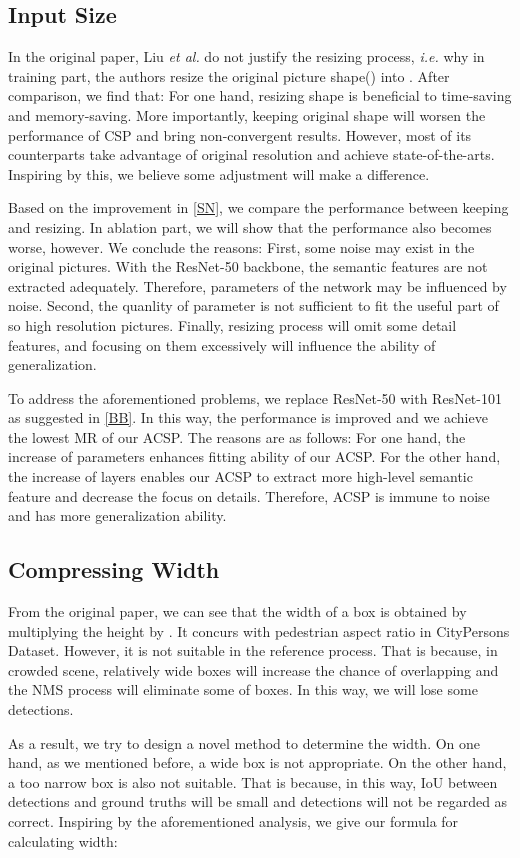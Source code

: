 \documentclass[twocolumn]{article}
\begin{document}
\subsection{Input Size}\label{is}
In the original paper\cite{liu2019high}, Liu \textit{et al.} do not justify the resizing process, \textit{i.e.} why in training part, the authors resize the original picture shape() into . After comparison, we find that: For one hand, resizing shape is beneficial to time-saving and memory-saving. More importantly, keeping original shape will worsen the performance of CSP\cite{liu2019high} and bring non-convergent results. However, most of its counterparts take advantage of original resolution and achieve state-of-the-arts. Inspiring by this, we believe some adjustment will make a difference.\par 
Based on the improvement in \ref{SN}, we compare the performance between keeping and resizing. In ablation part, we will show that the performance also becomes worse, however. We conclude the reasons: First, some noise may exist in the original pictures. With the ResNet-50 backbone, the semantic features are not extracted adequately. Therefore, parameters of the network may be influenced by noise. Second, the quanlity of parameter is not sufficient to fit the useful part of so high resolution pictures. Finally, resizing process will omit some detail features, and focusing on them excessively will influence the ability of generalization.\par 
To address the aforementioned problems, we replace ResNet-50 with ResNet-101 as suggested in \ref{BB}. In this way, the performance is improved and we achieve the lowest MR of our ACSP. The reasons are as follows: For one hand, the increase of parameters enhances fitting ability of our ACSP. For the other hand, the increase of layers enables our ACSP to extract more high-level semantic feature and decrease the focus on details. Therefore, ACSP is immune to noise and has more generalization ability.

\subsection{Compressing Width}
From the original paper\cite{liu2019high}, we can see that the width of a box is obtained by multiplying the height by . It concurs with pedestrian aspect ratio in CityPersons Dataset\cite{zhang2017citypersons}. However, it is not suitable in the reference process. That is because, in crowded scene, relatively wide boxes will increase the chance of overlapping and the NMS process will eliminate some of boxes. In this way, we will lose some detections.\par 
As a result, we try to design a novel method to determine the width. On one hand, as we mentioned before, a wide box is not appropriate. On the other hand, a too narrow box is also not suitable. That is because, in this way, IoU between detections and ground truths will be small and detections will not be regarded as correct. 
Inspiring by the aforementioned analysis, we give our formula for calculating width:
\end{document}
